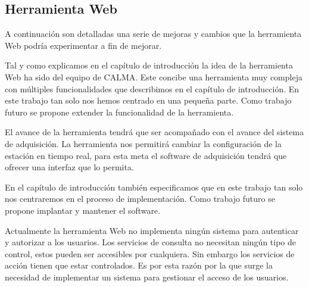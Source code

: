 	\subsection{Herramienta Web}
		A continuación son detalladas una serie de mejoras y cambios que la herramienta Web podría experimentar a fin de mejorar.
		\begin{description}[style=unboxed,leftmargin=0cm,labelwidth=1cm]
			\item[Extender funcionalidad]
				Tal y como explicamos en el capítulo de introducción la idea de la herramienta Web ha sido del equipo de CALMA. Este
				concibe una herramienta muy compleja con múltiples funcionalidades que describimos en el capítulo de introducción. En
				este trabajo tan solo nos hemos centrado en una pequeña parte. Como trabajo futuro se propone extender la
				funcionalidad de la herramienta.
				\par
				El avance de la herramienta tendrá que ser acompañado con el avance del sistema de adquisición. La herramienta nos
				permitirá cambiar la configuración de la estación en tiempo real, para esta meta el software de adquisición tendrá que
				ofrecer una interfaz que lo permita.
			\item[Implantación y mantenimiento]
				En el capítulo de introducción también especificamos que en este trabajo tan solo nos centraremos en el proceso de
				implementación. Como trabajo futuro se propone implantar y mantener el software.
			\item[Autenticación y autorización]
				Actualmente la herramienta Web no implementa ningún sistema para autenticar y autorizar a los usuarios. Los servicios
				de consulta no necesitan ningún tipo de control, estos pueden ser accesibles por cualquiera. Sin embargo los servicios
				de acción tienen que estar controlados. Es por esta razón por la que surge la necesidad de implementar un sistema para
				gestionar el acceso de los usuarios. 
		\end{description}
